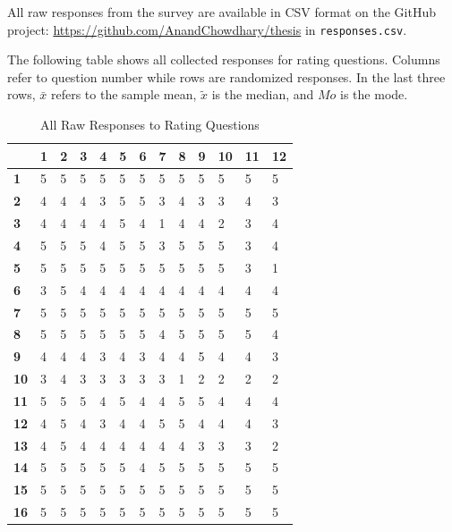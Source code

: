 \documentclass{article}
\begin{document}
All raw responses from the survey are available in CSV format on the GitHub project: \url{https://github.com/AnandChowdhary/thesis} in \texttt{responses.csv}.

The following table shows all collected responses for rating questions. Columns refer to question number while rows are randomized responses. In the last three rows, $\bar{x}$ refers to the sample mean, $\tilde{x}$ is the median, and $Mo$ is the mode.

\begin{table}[!htb]
	\begin{minipage}{1\linewidth}
		\caption{All Raw Responses to Rating Questions}
		\centering
		\begin{tabular}{|*{13}{p{0.5cm}|}}
			\hline
			& \textbf{1} & \textbf{2} & \textbf{3} & \textbf{4} & \textbf{5} & \textbf{6} & \textbf{7} & \textbf{8} & \textbf{9} & \textbf{10} & \textbf{11} & \textbf{12} \\
			\hline
			\textbf{1} & 5 & 5 & 5 & 5 & 5 & 5 & 5 & 5 & 5 & 5 & 5 & 5 \\
			\textbf{2} & 4 & 4 & 4 & 3 & 5 & 5 & 3 & 4 & 3 & 3 & 4 & 3 \\
			\textbf{3} & 4 & 4 & 4 & 4 & 5 & 4 & 1 & 4 & 4 & 2 & 3 & 4 \\
			\textbf{4} & 5 & 5 & 5 & 4 & 5 & 5 & 3 & 5 & 5 & 5 & 3 & 4 \\
			\textbf{5} & 5 & 5 & 5 & 5 & 5 & 5 & 5 & 5 & 5 & 5 & 3 & 1 \\
			\textbf{6} & 3 & 5 & 4 & 4 & 4 & 4 & 4 & 4 & 4 & 4 & 4 & 4 \\
			\textbf{7} & 5 & 5 & 5 & 5 & 5 & 5 & 5 & 5 & 5 & 5 & 5 & 5 \\
			\textbf{8} & 5 & 5 & 5 & 5 & 5 & 5 & 4 & 5 & 5 & 5 & 5 & 4 \\
			\textbf{9} & 4 & 4 & 4 & 3 & 4 & 3 & 4 & 4 & 5 & 4 & 4 & 3 \\
			\textbf{10} & 3 & 4 & 3 & 3 & 3 & 3 & 3 & 1 & 2 & 2 & 2 & 2 \\
			\textbf{11} & 5 & 5 & 5 & 4 & 5 & 4 & 4 & 5 & 5 & 4 & 4 & 4 \\
			\textbf{12} & 4 & 5 & 4 & 3 & 4 & 4 & 5 & 5 & 4 & 4 & 4 & 3 \\
			\textbf{13} & 4 & 5 & 4 & 4 & 4 & 4 & 4 & 4 & 3 & 3 & 3 & 2 \\
			\textbf{14} & 5 & 5 & 5 & 5 & 5 & 4 & 5 & 5 & 5 & 5 & 5 & 5 \\
			\textbf{15} & 5 & 5 & 5 & 5 & 5 & 5 & 5 & 5 & 5 & 5 & 5 & 5 \\
			\textbf{16} & 5 & 5 & 5 & 5 & 5 & 5 & 5 & 5 & 5 & 5 & 5 & 5 \\

\end{tabular}
\end{minipage}
\end{table}
\end{document}
